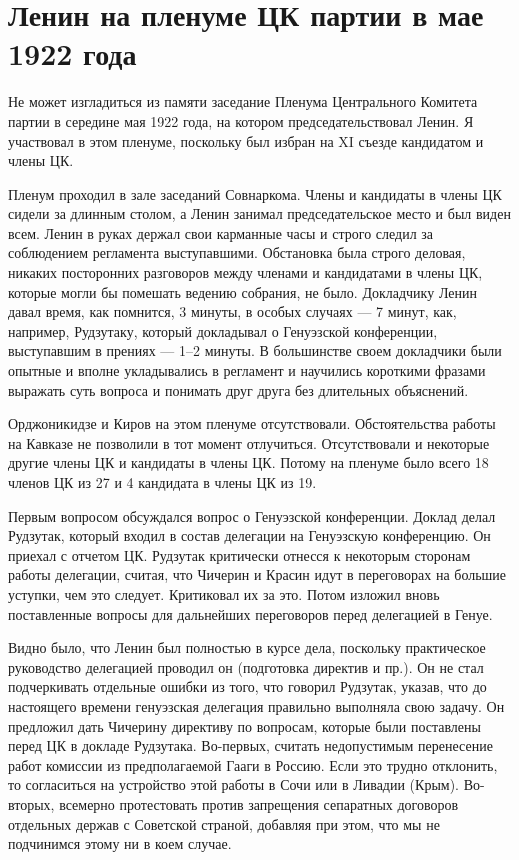 \documentclass[12pt, a4paper, openany]{book}
\begin{document}
\newpage
\section[Ленин на пленуме ЦК партии в мае 1922 года]{\center \textbf{Ленин на пленуме ЦК партии в мае 1922 года}}


Не может изгладиться из памяти заседание Пленума Центрального Комитета партии в середине мая 1922 года, на котором председательствовал Ленин. Я участвовал в этом пленуме, поскольку был избран на XI съезде кандидатом и члены ЦК.

Пленум проходил в зале заседаний Совнаркома. Члены и кандидаты в члены ЦК сидели за длинным столом, а Ленин занимал председательское место и был виден всем. Ленин в руках держал свои карманные часы и строго следил за соблюдением регламента выступавшими. Обстановка была строго деловая, никаких посторонних разговоров между членами и кандидатами в члены ЦК, которые могли бы помешать ведению собрания, не было. Докладчику Ленин давал время, как помнится, 3 минуты, в особых случаях — 7 минут, как, например, Рудзутаку, который докладывал о Генуэзской конференции, выступавшим в прениях — 1–2 минуты. В большинстве своем докладчики были опытные и вполне укладывались в регламент и научились короткими фразами выражать суть вопроса и понимать друг друга без длительных объяснений.

Орджоникидзе и Киров на этом пленуме отсутствовали. Обстоятельства работы на Кавказе не позволили в тот момент отлучиться. Отсутствовали и некоторые другие члены ЦК и кандидаты в члены ЦК. Потому на пленуме было всего 18 членов ЦК из 27 и 4 кандидата в члены ЦК из 19.

Первым вопросом обсуждался вопрос о Генуэзской конференции. Доклад делал Рудзутак, который входил в состав делегации на Генуэзскую конференцию. Он приехал с отчетом ЦК. Рудзутак критически отнесся к некоторым сторонам работы делегации, считая, что Чичерин и Красин идут в переговорах на большие уступки, чем это следует. Критиковал их за это. Потом изложил вновь поставленные вопросы для дальнейших переговоров перед делегацией в Генуе.

Видно было, что Ленин был полностью в курсе дела, поскольку практическое руководство делегацией проводил он (подготовка директив и пр.). Он не стал подчеркивать отдельные ошибки из того, что говорил Рудзутак, указав, что до настоящего времени генуэзская делегация правильно выполняла свою задачу. Он предложил дать Чичерину директиву по вопросам, которые были поставлены перед ЦК в докладе Рудзутака. Во-первых, считать недопустимым перенесение работ комиссии из предполагаемой Гааги в Россию. Если это трудно отклонить, то согласиться на устройство этой работы в Сочи или в Ливадии (Крым). Во-вторых, всемерно протестовать против запрещения сепаратных договоров отдельных держав с Советской страной, добавляя при этом, что мы не подчинимся этому ни в коем случае.
\end{document}
